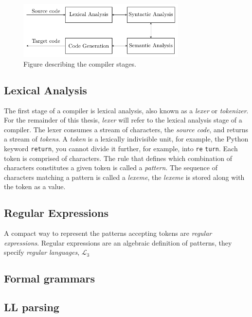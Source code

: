 \begin{figure}
  \caption{Figure describing the compiler stages.}
  \label{fig:compiler-stages}
  \centering
  \includegraphics[width=0.75\textwidth]{figures/compiler-stages.pdf}
\end{figure}

\subsection*{Lexical Analysis}
The first stage of a compiler is lexical analysis, also known as a \emph{lexer} or \emph{tokenizer}. For the remainder of this thesis, \emph{lexer} will refer to the lexical analysis stage of a compiler. The lexer consumes a stream of characters, the \emph{source code}, and returns a stream of \emph{tokens}. A \emph{token} is a lexically indivisible unit, for example, the Python keyword \texttt{return}, you cannot divide it further, for example, into \texttt{re} \texttt{turn}. Each token is comprised of characters. The rule that defines which combination of characters constitutes a given token is called a \emph{pattern}. The sequence of characters matching a pattern is called a \emph{lexeme}, the \emph{lexeme} is stored along with the token as a value.



\subsection*{Regular Expressions}
A compact way to represent the patterns accepting tokens are \emph{regular expressions}. Regular expressions are an algebraic definition of patterns, they specify \emph{regular languages}, $\mathcal{L}_3$


\subsection*{Formal grammars}
\subsection*{LL parsing}


